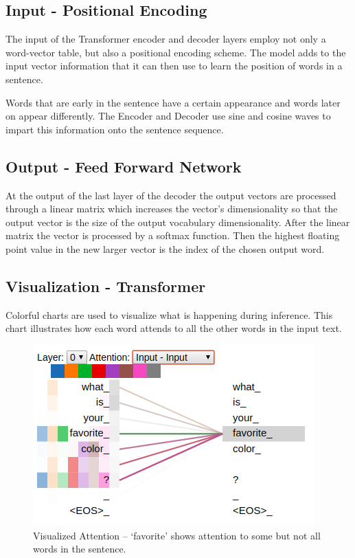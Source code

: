 \subsection{Input - Positional Encoding}
The input of the Transformer encoder and decoder layers employ not only a word-vector table, but also a positional encoding scheme. The model adds to the input vector information that it can then use to learn the position of words in a sentence. 

Words that are early in the sentence have a certain appearance and words later on appear differently. The Encoder and Decoder use sine and cosine waves to impart this information onto the sentence sequence. 

\subsection{Output - Feed Forward Network}
At the output of the last layer of the decoder the output vectors are processed through a linear matrix which increases the vector's dimensionality so that the output vector is the size of the output vocabulary dimensionality. After the linear matrix the vector is processed by a softmax function. Then the highest floating point value in the new larger vector is the index of the chosen output word.


\subsection{Visualization - Transformer}

Colorful charts are used to visualize what is happening during inference. This chart illustrates how each word attends to all the other words in the input text.

\begin{figure}[H]
	\begin{center}
		\includegraphics[scale=2]{Figure_3}
		
		
	\end{center}
	\caption[Visualized Attention]{Visualized Attention -- `favorite' shows attention to some but not all words in the sentence.}
	
	
\end{figure}

